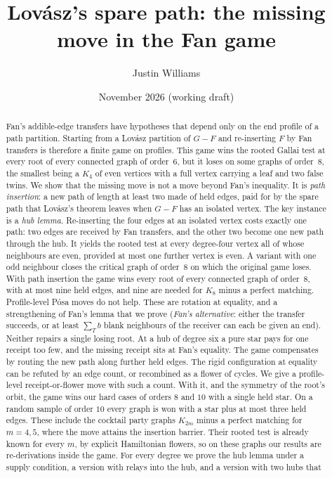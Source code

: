 \documentclass[11pt]{amsart}
\title{Lov\'asz's spare path: the missing move in the Fan game}
\author{Justin Williams}
\date{November 2026 (working draft)}
\theoremstyle{definition}
\begin{document}
\begin{abstract}
Fan's addible-edge transfers have hypotheses that depend only on the end profile of a path
partition. Starting from a Lov\'asz partition of $G-F$ and re-inserting $F$ by Fan transfers is
therefore a finite game on profiles. This game wins the rooted Gallai test at every root of every
connected graph of order~$6$, but it loses on some graphs of order~$8$, the smallest being a $K_4$
of even vertices with a full vertex carrying a leaf and two false twins. We show that the missing
move is not a move beyond Fan's inequality. It is \emph{path insertion}: a new path of length at
least two made of held edges, paid for by the spare path that Lov\'asz's theorem leaves when $G-F$
has an isolated vertex. The key instance is a \emph{hub lemma}. Re-inserting the four edges at an
isolated vertex costs exactly one path: two edges are received by Fan transfers, and the other
two become one new path through the hub. It yields the rooted test at every degree-four vertex all
of whose neighbours are even, provided at most one further vertex is even. A variant with one odd
neighbour closes the critical graph of order~$8$ on which the original game loses. With path
insertion
the game wins every root of every connected graph of order~$8$, with at most nine held edges, and
nine are needed for $K_8$ minus a perfect matching.
Profile-level P\'osa moves do not help. These are rotation at equality, and a strengthening of
Fan's lemma that we prove (\emph{Fan's alternative}: either the transfer succeeds, or at least
$\sum_T b$ blank neighbours of the receiver can each be given an end). Neither repairs a single
losing root. At a hub of degree six a pure star pays for one receipt too few, and the missing
receipt sits at Fan's equality. The game compensates by routing the new path along further held
edges. The rigid configuration at equality can be refuted by an edge count, or recombined as a
flower of cycles. We give a profile-level receipt-or-flower move with such a count. With it, and
the symmetry of the root's orbit, the game wins our hard cases of orders $8$ and $10$ with a
single held star. On a random sample of order $10$ every graph is won with a star plus at most
three held edges. These include the cocktail party graphs $K_{2m}$ minus a perfect matching for
$m=4,5$, where the move attains the insertion barrier. Their rooted test is already known for
every $m$, by explicit Hamiltonian flowers, so on these graphs our results are re-derivations
inside the game. For every degree we prove the hub lemma
under a supply condition, a version with relays into the hub, and a version with two hubs that

\end{abstract}
\end{document}
